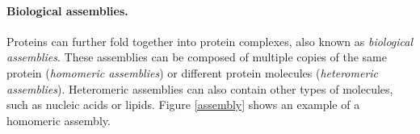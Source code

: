 \paragraph{Biological assemblies.}
Proteins can further fold together into protein complexes, also known as \textit{biological assemblies}.
These assemblies can be composed of multiple copies of the same protein (\textit{homomeric assemblies}) or different protein molecules (\textit{heteromeric assemblies}).
Heteromeric assemblies can also contain other types of molecules, such as  nucleic acids or lipids. Figure \ref{assembly} shows an example of a homomeric assembly.
\begin{figure}
    \centering
    \hspace{0.3in}
\end{figure}
